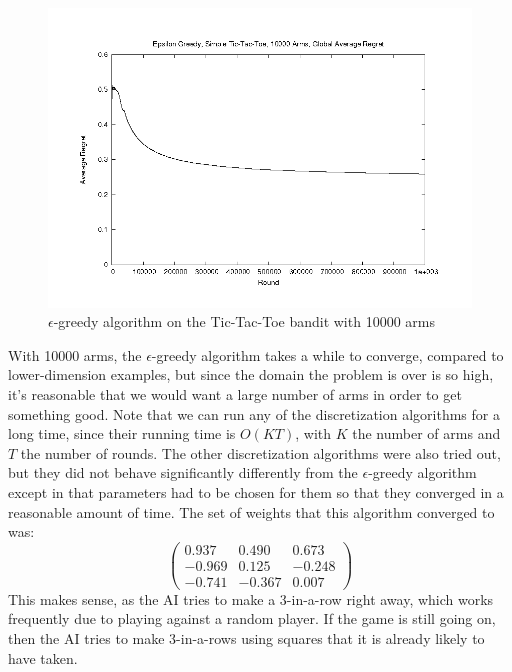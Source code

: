 \begin{figure}[!ht]
  \begin{center}
    \includegraphics[width=\figwidth]{data/tictactoe/egtoe10000_GA.png}
     \caption{$\epsilon$-greedy algorithm on the Tic-Tac-Toe bandit with
     10000 arms}
     \label{fig:egtoe}
  \end{center}
\end{figure}

With 10000 arms, the $\epsilon$-greedy algorithm takes a while to
converge, compared to lower-dimension examples, but since the domain
the problem is over is so high, it's reasonable that we would want a
large number of arms in order to get something good.  Note that we can
run any of the discretization algorithms for a long time, since their
running time is $O(KT)$, with $K$ the number of arms and $T$ the
number of rounds.  The other discretization algorithms were also tried
out, but they did not behave significantly differently from the
$\epsilon$-greedy algorithm except in that parameters had to be chosen
for them so that they converged in a reasonable amount of time.  The
set of weights that this algorithm converged to was:
\[
\left(
\begin{array}{ccc}
0.937 & 0.490 & 0.673 \\
-0.969 & 0.125 & -0.248 \\
-0.741 & -0.367 & 0.007
\end{array}
\right)
\]
This makes sense, as the AI tries to make a 3-in-a-row right away,
which works frequently due to playing against a random player.  If the
game is still going on, then the AI tries to make 3-in-a-rows using
squares that it is already likely to have taken.

